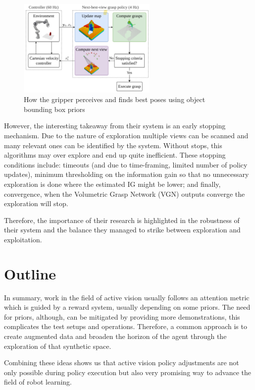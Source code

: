 \begin{figure}[h]
  \centering
  \includegraphics[width=0.6\textwidth]{assets/rel-work/target-grasp.png}
  \caption{How the gripper perceives and finds best poses using object bounding box priors \cite{breyer2022closedloopnextbestviewplanningtargetdriven}}\label{fig:closedloop}
\end{figure}

However, the interesting takeaway from their system is an early stopping mechanism. Due to the nature of exploration multiple views can be scanned and many relevant ones can be identified by the system. Without stops, this algorithms may over explore and end up quite inefficient. These stopping conditions include: timeouts (and due to time-framing, limited number of policy updates), minimum thresholding on the information gain so that no unnecessary exploration is done where the estimated IG might be lower; and finally, convergence, when the Volumetric Grasp Network (VGN) \cite{breyer2021volumetricgraspingnetworkrealtime} outputs converge the exploration will stop. 

Therefore, the importance of their research is highlighted in the robustness of their system and the balance they managed to strike between exploration and exploitation. 


\section{Outline}
In summary, work in the field of active vision usually follows an attention metric which is guided by a reward system, usually depending on some priors. The need for priors, although, can be mitigated by providing more demonstrations, this complicates the test setups and operations. Therefore, a common approach is to create augmented data and broaden the horizon of the agent through the exploration of that synthetic space.

Combining these ideas shows us that active vision policy adjustments are not only possible during policy execution but also very promising way to advance the field of robot learning.



